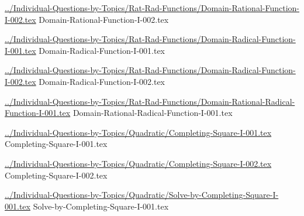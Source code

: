 \documentclass[answer,cancelspace,12pt]{exam}
\begin{document}
\begin{questions}
\question
\href{../Individual-Questions-by-Topics/Rat-Rad-Functions/Domain-Rational-Function-I-002.tex}{../Individual-Questions-by-Topics/Rat-Rad-Functions/Domain-Rational-Function-I-002.tex}
{Domain-Rational-Function-I-002.tex}

\question
\href{../Individual-Questions-by-Topics/Rat-Rad-Functions/Domain-Radical-Function-I-001.tex}{../Individual-Questions-by-Topics/Rat-Rad-Functions/Domain-Radical-Function-I-001.tex}
{Domain-Radical-Function-I-001.tex}

\question
\href{../Individual-Questions-by-Topics/Rat-Rad-Functions/Domain-Radical-Function-I-002.tex}{../Individual-Questions-by-Topics/Rat-Rad-Functions/Domain-Radical-Function-I-002.tex}
{Domain-Radical-Function-I-002.tex}

\question
\href{../Individual-Questions-by-Topics/Rat-Rad-Functions/Domain-Rational-Radical-Function-I-001.tex}{../Individual-Questions-by-Topics/Rat-Rad-Functions/Domain-Rational-Radical-Function-I-001.tex}
{Domain-Rational-Radical-Function-I-001.tex}


\question
\href{../Individual-Questions-by-Topics/Quadratic/Completing-Square-I-001.tex}{../Individual-Questions-by-Topics/Quadratic/Completing-Square-I-001.tex}
{Completing-Square-I-001.tex}


\question
\href{../Individual-Questions-by-Topics/Quadratic/Completing-Square-I-002.tex}{../Individual-Questions-by-Topics/Quadratic/Completing-Square-I-002.tex}
{Completing-Square-I-002.tex}


\question
\href{../Individual-Questions-by-Topics/Quadratic/Solve-by-Completing-Square-I-001.tex}{../Individual-Questions-by-Topics/Quadratic/Solve-by-Completing-Square-I-001.tex}
{Solve-by-Completing-Square-I-001.tex}



\end{questions}
\end{document}
